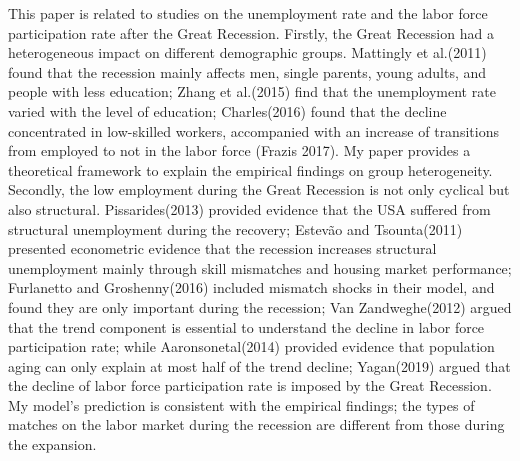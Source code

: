 \documentclass[12pt]{article}
\newcommand{\1}{\mathbb{1}}
\begin{document}
This paper is related to studies on the unemployment rate and the labor force participation rate after the Great Recession. 
Firstly, the Great Recession had a heterogeneous impact on different demographic groups. 
Mattingly et al.(2011)\cite{Mattinglyetal2011} found that the recession mainly affects men, single parents, young adults, and people with less education;
Zhang et al.(2015)\cite{Zhangetal2015} find that the unemployment rate varied with the level of education; 
Charles(2016)\cite{Charles2016} found that the decline concentrated in low-skilled workers, accompanied with an increase of transitions from employed to not in the labor force (Frazis 2017\cite{Frazis2017}). 
My paper provides a theoretical framework to explain the empirical findings on group heterogeneity.   \\

Secondly, the low employment during the Great Recession is not only cyclical but also structural. 
Pissarides(2013)\cite{Pissarides2013} provided evidence that the USA suffered from structural unemployment during the recovery;
Estev{\~a}o and Tsounta(2011)\cite{EstevaoTsounta2011} presented econometric evidence that the recession increases structural unemployment mainly through skill mismatches and housing market performance;
Furlanetto and Groshenny(2016)\cite{FurlanettoGroshenny2016} included mismatch shocks in their model, and found they are only important during the recession;
Van Zandweghe(2012)\cite{VanZandweghe2012} argued that the trend component is essential to understand the decline in labor force participation rate;
while Aaronsonetal(2014)\cite{Aaronsonetal2014} provided evidence that population aging can only explain at most half of the trend decline;
Yagan(2019)\cite{Yagan2019} argued that the decline of labor force participation rate is imposed by the Great Recession.
My model's prediction is consistent with the empirical findings; the types of matches on the labor market during the recession are different from those during the expansion.  \\
\end{document}
